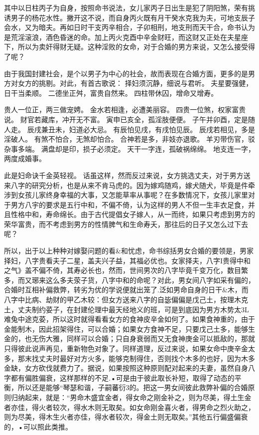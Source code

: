 其中以日柱丙子为自身，按照命书说法，女儿家丙子日出生是犯了阴阳煞，荣有挑诱男子的杨花水性。撇开这不说，而自身丙火既有月干癸水克我为夫，可地支辰子会水，又为暗夫。再如日时干支丙辛相合，子卯相刑，地支刑而天干合，命书认为是荒淫滚浪，酒色昏迷的命。加上丙火克酉中辛金财旺，而这财又正处在夫星座下，所以为卖奸得财无疑。这种淫败的女命，对于合婚的男方来说，又怎么接受得了呢？

由于我国封建社会，是个以男子为中心的社会，故而表现在合婚方面，更多的是男方对女方的挑剔。对此，有首古歌说：
择妇须沉静，细说与君听。
夫星要强健，日干当柔顺。
二德坐正舛，富贵自然来。
四柱带休囚，增命又增寿。

贵人一位正，两三做宠娉。
金水若相逢，必遭美丽容。
四贵一位煞，权家富贵说。
财官若藏库，冲开无不富。
寅申已亥全，孤淫肢便便。
子午并卯酉，定是随人走。
辰戌兼丑未，妇道必大忌。
有辰怕见戌，有戌怕见辰。
辰戌若相见，多是淫破人。
有煞不怕合，无煞却怕合。
合神若是多，非妓亦退歌。
羊刃带伤官，驳杂事多端。
满盘却是印，损子必须定。
天干一字连，孤破祸绵绵。
地支连一字，两度成婚事。

此是妇命诀千金英轻视。
话虽这样，然而反过来说，女方挑选丈夫，对于男方送来八字的研究分析，也是从来不肯马虎的。因为嫁鸡随鸡，嫁犬随犬，毕竟是件牵涉到女孩儿家终身幸福的大事，又怎能草率从事呢？在多数情况下，女孩儿家里对于男方八宇的要求是五行中和，不偏不倚，认为这样的男人不但一生丰衣足食，并且性格中和，寿命绵长。由于古代提倡女子嫁人，从一而终，如果只考虑到男方的荣华富贵，而不考虑到男方的性情脾气和生命寿夭，那往后的日子又怎么过下去呢？

所以，出于以上种种对嫁娶问题的看&和忧虑，命书综括男女合婚的要领是，男家择妇，八字贵看夫子二星，盖夫兴子益，其福必优也。女家择夫，八字I贵得中和之气》盖不偏不倚，其寿必长也，然而，世间男次的八字毕竟千变万化，数目繁多，而又琊来这么多夫荥子货，八字中和的命呢？对此，男女间八字如采有偏的，合婚时互相补偏救弊，转劣为优的学说便就出笼了.泛如男命自身的日干&木，而八字中比病、劫财的甲乙木较：但女方送来八字的自毖偏偏是戊己土，按理木克土，丈夫制约荽子，在封建伦理中最天经地义的班，可是到底因为男方木势太3L难兔中途克荽，所以这时就得看看女方的食神皮辛金如何了。如果食神重的，由于金能制木，因此招架得住，可以合婚；如果女方食神不足，只要戊己土多，能够生金的，也无伤大雅，同样可以合婚；只自身衰弱而又无食神庚金可以抵敌的，那就只得彼此说声再见，重新物色对象了。同样道理，反过来说，如果女命中庚辛金太多，那末找丈夫时最好对方火多，能够克制得住，否则找个木多的也好，因为木多金缺，女方砍伐就费力了。据说，如果按照这种原则配对起来的夫妻，虽然自身八字都有偏胜偏衰，这样那样的不足.•可是由于彼此取长补短，取得了动态的平衡，所以还是能够“琴瑟和谐，子嗣蕃衍3的。把这一男女间彼此救弊补偏的合婚原则归纳起来，就是：“男命木盛宜金者，得女命之刚金补之，则为尽美，得土生金者亦佳，得火者较次，得水木则无取矣。如女命刚金喜火者，得男命之烈火助之，则为尽美，得木生火者亦佳，得水者较次，得金土则无取矣。”其他五行偏盛偏衰的，•可以照此类推。

